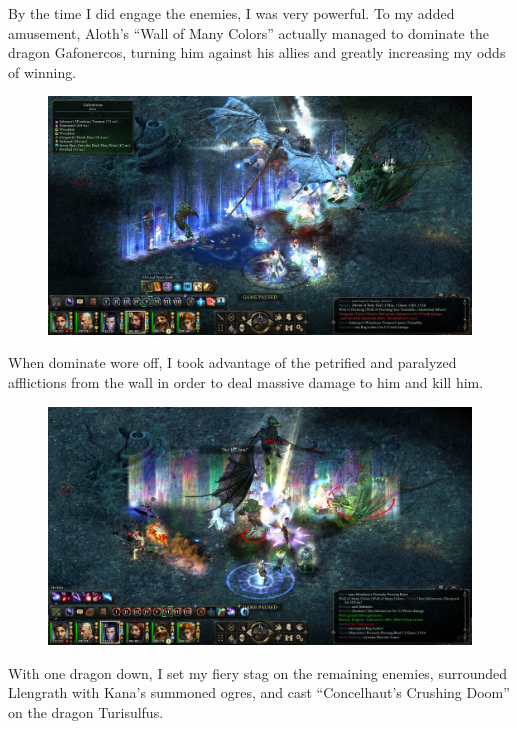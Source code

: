\documentclass{article}
\begin{document}
By the time I did engage the enemies, I was very powerful.  To my added amusement, Aloth's ``Wall of Many Colors'' actually managed to dominate the dragon Gafonercos, turning him against his allies and greatly increasing my odds of winning.

\begin{figure}
\includegraphics[scale=0.33]{files/blog/2020_01_18_poe_potd_wmpt2/2020_01_18_llengrath3.jpg}
\end{figure}

When dominate wore off, I took advantage of the petrified and paralyzed afflictions from the wall in order to deal massive damage to him and kill him.

\begin{figure}
\includegraphics[scale=0.33]{files/blog/2020_01_18_poe_potd_wmpt2/2020_01_18_llengrath4.jpg}
\end{figure}

With one dragon down, I set my fiery stag on the remaining enemies, surrounded Llengrath with Kana's summoned ogres, and cast ``Concelhaut's Crushing Doom'' on the dragon Turisulfus.
\end{document}
